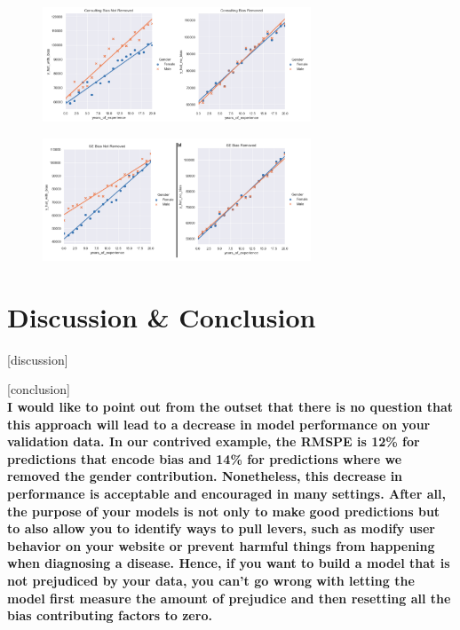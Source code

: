 \documentclass{sigchi}
\begin{document}
\begin{figure}[h]
	\includegraphics[width=8cm]{consulting_comparison.png}
	\centering
\end{figure}

\begin{figure}[h]
	\includegraphics[width=8cm]{se_comparison.png}
	\centering
\end{figure}



\section{Discussion \& Conclusion}
	[discussion]
	
	[conclusion] \\
	\textbf{I would like to point out from the outset that there is no question that this approach will lead to a decrease in model performance on your validation data. In our contrived example, the RMSPE is 12\% for predictions that encode bias and 14\% for predictions where we removed the gender contribution. Nonetheless, this decrease in performance is acceptable and encouraged in many settings. After all, the purpose of your models is not only to make good predictions but to also allow you to identify ways to pull levers, such as modify user behavior on your website or prevent harmful things from happening when diagnosing a disease. Hence, if you want to build a model that is not prejudiced by your data, you can’t go wrong with letting the model first measure the amount of prejudice and then resetting all the bias contributing factors to zero.}


\newpage
\balance{}


\end{document}
